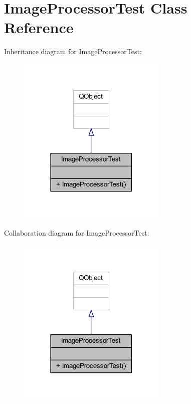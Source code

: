 \hypertarget{class_image_processor_test}{}\section{Image\+Processor\+Test Class Reference}
\label{class_image_processor_test}


Inheritance diagram for Image\+Processor\+Test\+:\nopagebreak
\begin{figure}[H]
\begin{center}
\leavevmode
\includegraphics[width=201pt]{d9/dbb/class_image_processor_test__inherit__graph}
\end{center}
\end{figure}


Collaboration diagram for Image\+Processor\+Test\+:\nopagebreak
\begin{figure}[H]
\begin{center}
\leavevmode
\includegraphics[width=201pt]{d4/d1e/class_image_processor_test__coll__graph}
\end{center}
\end{figure}


